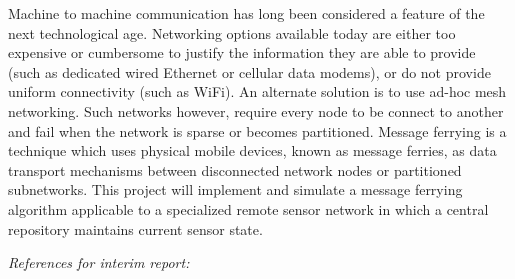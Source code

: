 
Machine to machine communication has long been considered a feature of the next technological age. 
Networking options available today are either too expensive or cumbersome to justify the information they are able to provide (such as dedicated wired Ethernet or cellular data modems), or do not provide uniform connectivity (such as WiFi). 
An alternate solution is to use ad-hoc mesh networking. 
Such networks however, require every node to be connect to another and fail when the network is sparse or becomes partitioned.
Message ferrying is a technique which uses physical mobile devices, known as message ferries, as data transport mechanisms between disconnected network nodes or partitioned subnetworks.
This project will implement and simulate a message ferrying algorithm applicable to a specialized remote sensor network in which a central repository maintains current sensor state.

\emph{References for interim report:}
~\cite{adhocmsgferry}
~\cite{hybrid}
~\cite{Routing}
~\cite{wearable}
~\cite{QoSrouting}
~\cite{efficientrouting}
~\cite{implement}
~\cite{book1}